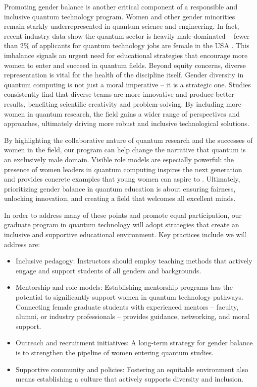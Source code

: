 \documentclass{scrreprt}
\begin{document}
Promoting gender balance is another critical component of a
responsible and inclusive quantum technology program. Women and other
gender minorities remain starkly underrepresented in quantum science
and engineering. In fact, recent industry data show the quantum sector
is heavily male-dominated – fewer than $2\%$ of applicants for quantum
technology jobs are female in the USA \cite{workforce}. This imbalance signals an urgent need for
educational strategies that encourage more women to enter and succeed
in quantum fields. Beyond equity concerns, diverse representation is
vital for the health of the discipline itself. Gender diversity in
quantum computing is not just a moral imperative – it is  a strategic one. 
Studies consistently find that diverse teams are more innovative and
produce better results, benefiting scientific creativity and
problem-solving. By including more women in quantum research, the field
gains a wider range of perspectives and approaches, ultimately driving
more robust and inclusive technological solutions.


By highlighting the collaborative nature of quantum research and the
successes of women in the field, our program can help change the
narrative that quantum is an exclusively male domain. Visible role
models are especially powerful: the presence of women leaders in
quantum computing inspires the next generation and provides concrete
examples that young women can aspire to . Ultimately, prioritizing
gender balance in quantum education is about ensuring fairness,
unlocking innovation, and creating a field that welcomes all excellent
minds.

In order to address many of these points and promote equal
participation, our graduate program in quantum technology will adopt
strategies that create an inclusive and supportive educational
environment. Key practices include we will address are:

\begin{itemize}
\item Inclusive pedagogy: Instructors should employ teaching methods that actively engage and support students of all genders and backgrounds.
\item Mentorship and role models: Establishing mentorship programs has the potential to  significantly support women in quantum technology pathways. Connecting female graduate students with experienced mentors – faculty, alumni, or industry professionals – provides guidance, networking, and moral support. 
\item Outreach and recruitment initiatives: A long-term strategy for gender balance is to strengthen the pipeline of women entering quantum studies. 
\item Supportive community and policies: Fostering an equitable environment also means establishing a culture that actively supports diversity and inclusion. 
\end{itemize}
\end{document}
